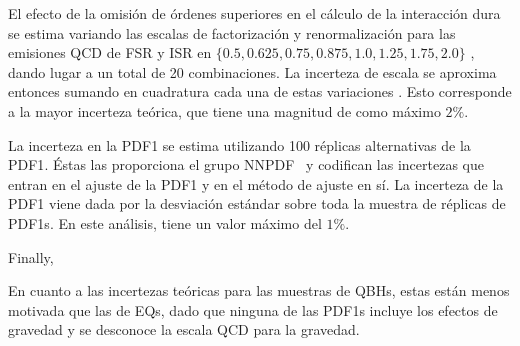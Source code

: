 El efecto de la omisión de órdenes superiores en el cálculo de la interacción dura se estima variando las escalas de factorización y renormalización para las emisiones \ac{QCD} de \ac{FSR} y \ac{ISR} en \(\{0.5, 0.625, 0.75, 0.875, 1.0, 1.25, 1.75, 2.0\}\)
, dando lugar a un total de 20 combinaciones. La incerteza de escala se aproxima entonces sumando en cuadratura cada una de estas variaciones
. Esto corresponde a la mayor incerteza teórica, que tiene una magnitud de como máximo \(2\%\).

La incerteza en la \ac{PDF1} se estima utilizando 100 réplicas alternativas de la \ac{PDF1}. Éstas las proporciona el grupo NNPDF~\cite{NNPDF2} y codifican las incertezas que entran en el ajuste de la \ac{PDF1} y en el método de ajuste en sí. La incerteza de la \ac{PDF1} viene dada por la desviación estándar sobre toda la muestra de réplicas de \acp{PDF1}. En este análisis, tiene un valor m\'aximo del \(1\%\).

Finally,

En cuanto a las incertezas teóricas para las muestras de \acp{QBH}, estas están menos motivada que las de \acp{EQ}, dado que ninguna de las \acp{PDF1} incluye los efectos de gravedad y se desconoce la escala \ac{QCD} para la gravedad.